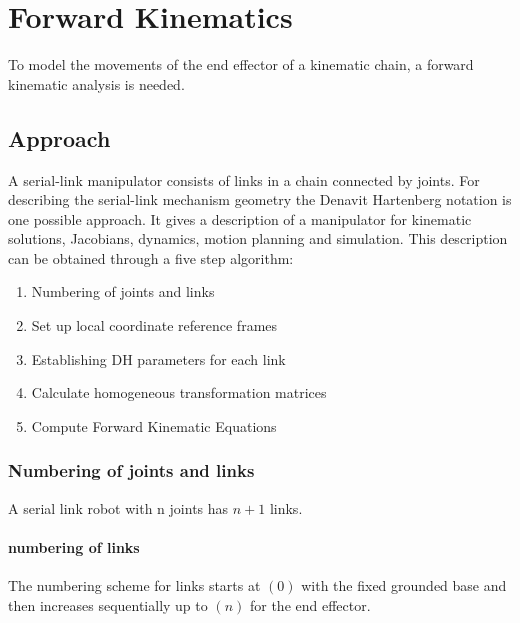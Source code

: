 \section{Forward Kinematics}

To model the movements of the end effector of a kinematic chain, a forward kinematic analysis is needed. 

\subsection{Approach}
A serial-link manipulator consists of links in a chain connected by joints. 
For describing the serial-link mechanism geometry the Denavit Hartenberg notation is one possible approach.
It gives a description of a manipulator for kinematic solutions, Jacobians, dynamics, motion planning and simulation. 
This description can be obtained through a five step algorithm:\cite{ConstantinForwardKA}

\begin{enumerate}
	\item Numbering of joints and links
	\item Set up local coordinate reference frames
	\item Establishing \ac{DH} parameters for each link
	\item Calculate homogeneous transformation matrices
	\item Compute Forward Kinematic Equations
\end{enumerate}

\subsubsection{Numbering of joints and links}
A serial link robot with n joints has $n+1$ links. 

\paragraph{numbering of links}
The numbering scheme for links starts at $(0)$ with the fixed grounded base and then increases sequentially up to $(n)$ for the end effector.

